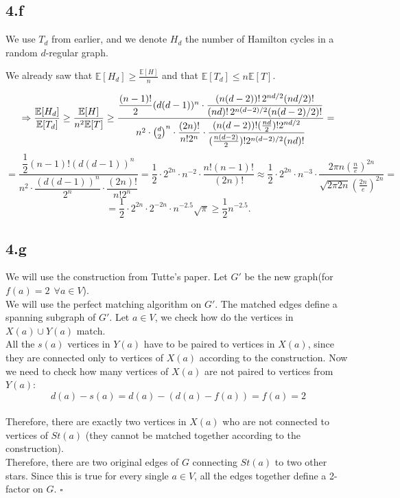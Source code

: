 \documentclass{article}
\begin{document}
\subsection*{4.f}
We use $T_d$ from earlier, and we denote $H_d$ the number of Hamilton cycles in a random $d$-regular graph. 

We already saw that $\mathbb{E}[H_d]\geq\frac{\mathbb{E}[H]}{n}$ and that $\mathbb{E}[T_d]\leq{n\mathbb{E}[T]}$.

\[\Rightarrow\frac{\mathbb{E}[H_d]}{\mathbb{E}[T_d]}\geq
\frac{\mathbb{E}[H]}{n^2 \mathbb{E}[T]} \\[2mm]
\geq
\frac{
\dfrac{(n-1)!}{2} (d(d-1))^n \cdot
\dfrac{(n(d-2))! \, 2^{nd/2} (nd/2)!}{(nd)! \, 2^{n(d-2)/2} (n(d-2)/2)!}
}{
n^2 \cdot \binom{d}{2}^n \cdot 
\dfrac{(2n)!}{n! 2^n} \cdot 
\dfrac{(n(d-2))! (\tfrac{nd}{2})! 2^{nd/2}}{(\tfrac{n(d-2)}{2})! 2^{n(d-2)/2} (nd)!}
}
=\]\[=
\frac{
\dfrac{1}{2} (n-1)! (d(d-1))^n
}{
n^2 \cdot \dfrac{(d(d-1))^n}{2^n} \cdot \dfrac{(2n)!}{n! 2^n}
}
=\frac{1}{2}\cdot2^{2n}\cdot n^{-2}\cdot\frac{n!(n-1)!}{(2n)!
}
\approx\frac{1}{2}\cdot2^{2n}\cdot n^{-3}\cdot\frac{2\pi n(\frac{n}{e})^{2n}}{\sqrt{2\pi 2n}(\frac{2n}{e})^{2n}
}
=\]\[=\frac{1}{2}\cdot2^{2n}\cdot2^{-2n}\cdot n^{-2.5}\sqrt{\pi
}
\geq\frac{1}{2} n^{-2.5}.\]

\subsection*{4.g}
We will use the construction from Tutte's paper. Let $G'$ be the new graph(for $f(a)=2\  \ \forall a \in V$).\\
We will use the perfect matching algorithm on $G'$. The matched edges define a spanning subgraph of $G'$.
Let $a \in V$, we check how do the vertices in $X(a)\cup Y(a)$ match.\\
All the $s(a)$ vertices in $Y(a)$ have to be paired to vertices in $X(a)$, since they are connected only to vertices of $X(a)$ according to the construction. Now we need to check how many vertices of $X(a)$ are not paired to vertices from $Y(a)$:\\
\[
d(a)-s(a)=d(a)-(d(a)-f(a))=f(a)=2
\]\\
Therefore, there are exactly two vertices in $X(a)$ who are not connected to vertices of $St(a)$ (they cannot be matched together according to the construction).\\
Therefore, there are two original edges of $G$ connecting $St(a)$ to two other stars. Since this is true for every single $a \in V$, all the edges together define a 2-factor on $G$.
\hfill $\square$
\end{document}
